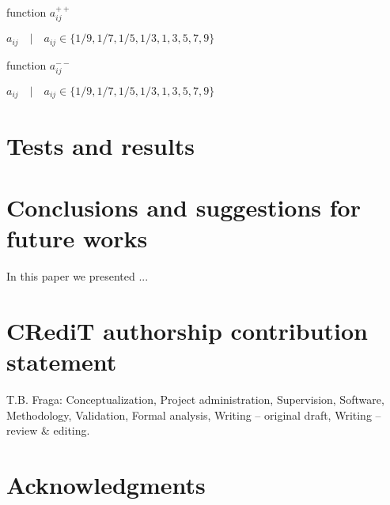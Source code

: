 \documentclass[authoryear,manuscript,12pt]{elsarticle}
\begin{document}
\begin{algorithm}
\caption{function $a_{ij}^{++}$}\label{alg:CA}
\begin{algorithmic}
\Require $a_{ij} \quad | \quad a_{ij} \in \{1/9, 1/7, 1/5, 1/3, 1, 3, 5, 7, 9\}$
	\EndIf
{}
\end{algorithmic}
\end{algorithm}

\begin{algorithm}
\caption{function $a_{ij}^{--}$}\label{alg:CA}
\begin{algorithmic}
\Require $a_{ij} \quad | \quad a_{ij} \in \{1/9, 1/7, 1/5, 1/3, 1, 3, 5, 7, 9\}$
	\EndIf
{}
\end{algorithmic}
\end{algorithm}


\section{Tests and results}
\label{sec:results}



\section{Conclusions and suggestions for future works}
\label{sec:conclusions}

In this paper we presented ...

\section{CRediT authorship contribution statement} 
\label{sec:contributions}

T.B. Fraga: Conceptualization, Project administration, Supervision, Software, Methodology, Validation, Formal analysis, Writing – original draft, Writing – review \& editing.

\section{Acknowledgments}
\label{sec:acknowledgments}

\end{document}
